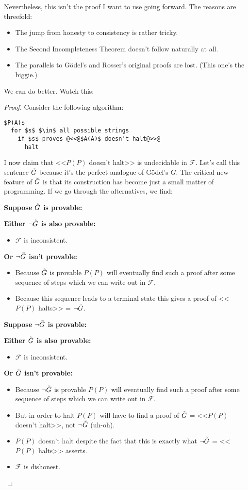 \documentclass{article}
\theoremstyle{theorem}
\newcommand{\nameditem}[1]{\item\textbf{#1}}
\newcommand{\impl}{\item[$\Rightarrow$]}
\newcommand{\infi}[1]{\accentset{\scalebox{0.35}{$\infty$}}{#1}}
\begin{document}
Nevertheless, this isn't the proof I want to use going forward. The reasons are threefold:
\begin{itemize}
\item The jump from honesty to consistency is rather tricky.
\item The Second Incompleteness Theorem doesn't follow naturally at all.
\item The parallels to Gödel's and Rosser's original proofs are lost. (This one's the biggie.)
\end{itemize}
We can do better. Watch this:
\begin{proof}
Consider the following algorithm:\\[0.5em]
\begin{minipage}{\linewidth}
\begin{lstlisting}
$P(A)$
  for $s$ $\in$ all possible strings
    if $s$ proves @<<@$A(A)$ doesn't halt@>>@
      halt
\end{lstlisting}
\end{minipage}
I now claim that <<$P(P)$ doesn't halt>> is undecidable in $\mathcal{F}$. Let's call this sentence $\infi{G}$ because it's the perfect analogue of Gödel's $G$. The critical new feature of $\infi{G}$ is that its construction has become just a small matter of programming. If we go through the alternatives, we find:
\begin{description}
\nameditem{Suppose $\infi{G}$ is provable:}
\begin{description}
\nameditem{Either $\neg \infi{G}$ is also provable:}
\begin{itemize}
\impl $\mathcal{F}$ is inconsistent. \lightning
\end{itemize}
\nameditem{Or $\neg \infi{G}$ isn't provable:}
\begin{itemize}
\impl Because $\infi{G}$ is provable $P(P)$ will eventually find such a proof after some sequence of steps which we can write out in $\mathcal{F}$.
\impl Because this sequence leads to a terminal state this gives a proof of <<$P(P)$ halts>> = $\neg \infi{G}$. \lightning
\end{itemize}
\end{description}
\nameditem{Suppose $\neg \infi{G}$ is provable:}
\begin{description}
\nameditem{Either $\infi{G}$ is also provable:}
\begin{itemize}
\impl $\mathcal{F}$ is inconsistent. \lightning
\end{itemize}
\nameditem{Or $\infi{G}$ isn't provable:}
\begin{itemize}
\impl Because $\neg \infi{G}$ is provable $P(P)$ will eventually find such a proof after some sequence of steps which we can write out in $\mathcal{F}$.
\impl But in order to halt $P(P)$ will have to find a proof of $\infi{G}$ = <<$P(P)$ doesn't halt>>, not $\neg \infi{G}$ (uh-oh).
\impl $P(P)$ doesn't halt despite the fact that this is exactly what $\neg \infi{G}$ = <<$P(P)$ halts>> asserts.
\impl $\mathcal{F}$ is dishonest. \lightning
\end{itemize}
\end{description}
\end{description}
\end{proof}
\end{document}
